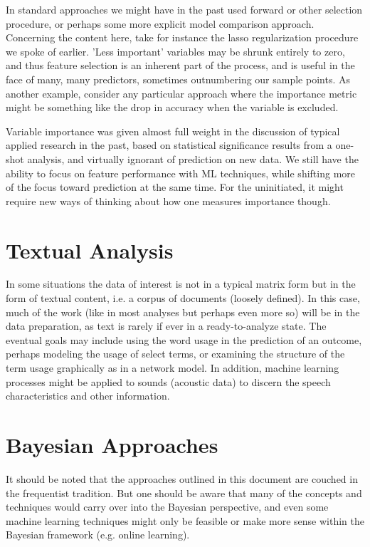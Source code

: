 \documentclass[english,nohyper,titlepage]{tufte-handout}\usepackage{knitr}
\begin{document}
In standard approaches we might have in the past used forward or other selection procedure, or perhaps some more explicit model comparison approach.  Concerning the content here, take for instance the lasso regularization procedure we spoke of earlier.  'Less important' variables may be shrunk entirely to zero, and thus feature selection is an inherent part of the process, and is useful in the face of many, many predictors, sometimes outnumbering our sample points. As another example, consider any particular approach where the importance metric might be something like the drop in accuracy when the variable is excluded.

Variable importance was given almost full weight in the discussion of typical applied research in the past, based on statistical significance results from a one-shot analysis, and virtually ignorant of prediction on new data.  We still have the ability to focus on feature performance with ML techniques, while shifting more of the focus toward prediction at the same time.  For the uninitiated, it might require new ways of thinking about how one measures importance though.

\section{Textual Analysis}
In some situations the data of interest is not in a typical matrix form but in the form of textual content, i.e. a corpus of documents (loosely defined).  In this case, much of the work (like in most analyses but perhaps even more so) will be in the data preparation, as text is rarely if ever in a ready-to-analyze state.  The eventual goals may include using the word usage in the prediction of an outcome, perhaps modeling the usage of select terms, or examining the structure of the term usage graphically as in a network model.  In addition, machine learning processes might be applied to sounds (acoustic data) to discern the speech characteristics and other information.

\section{Bayesian Approaches}
It should be noted that the approaches outlined in this document are couched in the frequentist tradition.  But one should be aware that many of the concepts and techniques would carry over into the Bayesian perspective, and even some machine learning techniques might only be feasible or make more sense within the Bayesian framework (e.g. online learning). 
\end{document}
